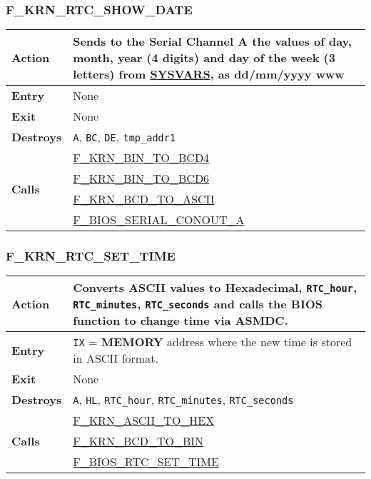     \subsubsection{F\_KRN\_RTC\_SHOW\_DATE}
    \label{func:fkrnrtcshowdate}
    \begin{tabular}{l p{15cm}}
        \hline\textbf{Action}
        & Sends to the \textbf{Serial Channel A} the values of day, month,
        year (4 digits) and day of the week (3 letters) from
        \hyperref[sec:ram_memmap]{SYSVARS}, as dd/mm/yyyy www\\
        \hline\textbf{Entry} & None \\
        \hline\textbf{Exit} & None \\
        \hline\textbf{Destroys} & \texttt{A}, \texttt{BC}, \texttt{DE},
        \texttt{tmp\_addr1}\\
        \hline\multirow[t]{4}{4em}{\textbf{Calls}}
        & \hyperref[func:fkrnbintobcd4]{F\_KRN\_BIN\_TO\_BCD4}\\
        & \hyperref[func:fkrnbintobcd6]{F\_KRN\_BIN\_TO\_BCD6}\\
        & \hyperref[func:fkrnbcdtoascii]{F\_KRN\_BCD\_TO\_ASCII}\\
        & \hyperref[func:fbiosserialconouta]{F\_BIOS\_SERIAL\_CONOUT\_A}\\
        \hline
    \end{tabular}

    \subsubsection{F\_KRN\_RTC\_SET\_TIME}
    \label{func:fkrnrtcsettime}
    \begin{tabular}{l p{15cm}}
        \hline\textbf{Action}
        & Converts ASCII values to Hexadecimal, \texttt{RTC\_hour},
        \texttt{RTC\_minutes}, \texttt{RTC\_seconds} and calls the BIOS
        function to change time via \textbf{ASMDC}.\\
        \hline\textbf{Entry} & \texttt{IX} = \textbf{MEMORY} address where
        the new time is stored in ASCII format.\\
        \hline\textbf{Exit} & None \\
        \hline\textbf{Destroys} & \texttt{A}, \texttt{HL}, \texttt{RTC\_hour},
        \texttt{RTC\_minutes}, \texttt{RTC\_seconds}\\
        \hline\multirow[t]{3}{4em}{\textbf{Calls}}
        & \hyperref[func:fkrnasciitohex]{F\_KRN\_ASCII\_TO\_HEX}\\
        & \hyperref[func:fkrnbcdtobin]{F\_KRN\_BCD\_TO\_BIN}\\
        & \hyperref[func:fbiosrtcsettime]{F\_BIOS\_RTC\_SET\_TIME}\\
        \hline
    \end{tabular}

